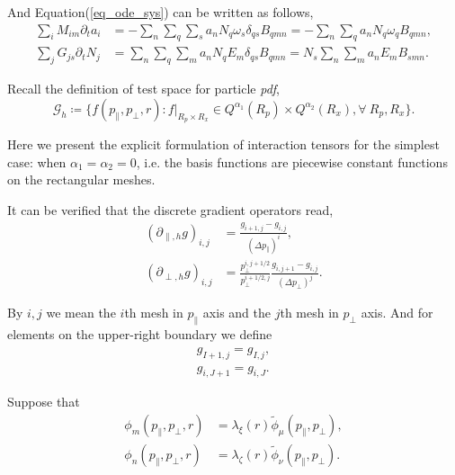 \documentclass{article}
\numberwithin{equation}{section}
\begin{document}
And Equation(\ref{eq_ode_sys}) can be written as follows,
\begin{equation}\label{eq_odesys_tensor}
    \begin{split}
        \sum_{i}M_{im}\partial_{t}a_{i}&=-\sum_{n}\sum_{q}\sum_{s}a_{n}N_{q}\omega_{s}\delta_{qs}B_{qmn}=-\sum_{n}\sum_{q}a_{n}N_{q}\omega_{q}B_{qmn},\\
        \sum_{j}G_{js}\partial_{t}N_{j}&=\sum_{n}\sum_{q}\sum_{m}a_{n}N_{q}E_{m}\delta_{qs}B_{qmn}=N_{s}\sum_{n}\sum_{m}a_{n}E_{m}B_{smn}.
    \end{split}
\end{equation}

Recall the definition of test space for particle \textit{pdf},
\begin{equation*}
    \mathcal{G}_{h}\coloneqq\{f(p_{\parallel},p_{\perp},r):f|_{R_{p}\times R_{x}}\in Q^{\alpha_{1}}(R_{p})\times Q^{\alpha_{2}}(R_{x}),\forall~R_{p},R_{x}\}.
\end{equation*}

Here we present the explicit formulation of interaction tensors for the simplest case: when $\alpha_{1} = \alpha_{2} = 0$, i.e. the basis functions are piecewise constant functions on the rectangular meshes. 

It can be verified that the discrete gradient operators read,
\begin{equation}\label{p0grad}
\begin{split}
    \left(\partial_{\parallel,h}g\right)_{i,j}&=\frac{g_{i+1,j}-g_{i,j}}{\left(\Delta p_{\parallel}\right)^{i}},\\
    \left(\partial_{\perp,h}g\right)_{i,j}&=\frac{p_{\perp}^{i,j+1/2}}{p_{\perp}^{i+1/2,j}}\frac{g_{i,j+1}-g_{i,j}}{\left(\Delta p_{\perp}\right)^{j}}.
\end{split}    
\end{equation}

By $i,j$ we mean the $i$th mesh in $p_{\parallel}$ axis and the $j$th mesh in $p_{\perp}$ axis. And for elements on the upper-right boundary we define
\begin{equation*}
    \begin{split}
        g_{I+1,j}=g_{I,j},\\
        g_{i,J+1}=g_{i,J}.
    \end{split}
\end{equation*}

Suppose that
\begin{equation*}
    \begin{split}
        \phi_{m}(p_{\parallel},p_{\perp},r)&=\lambda_{\xi}(r)\tilde{\phi}_{\mu}(p_{\parallel},p_{\perp}),\\
        \phi_{n}(p_{\parallel},p_{\perp},r)&=\lambda_{\zeta}(r)\tilde{\phi}_{\nu}(p_{\parallel},p_{\perp}).
    \end{split}
\end{equation*}
\end{document}
